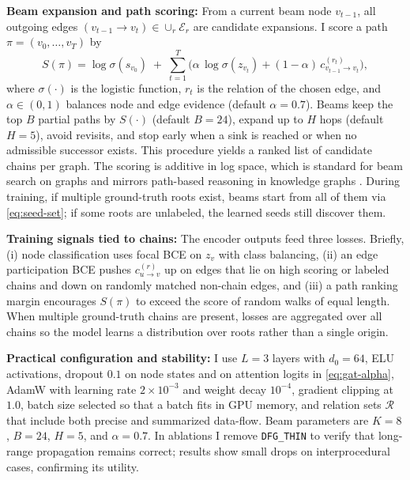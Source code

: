\documentclass{buthesis}
\begin{document}
\textbf{Beam expansion and path scoring:} From a current beam node $v_{t-1}$, all outgoing edges $(v_{t-1}\!\to\!v_t)\in\cup_r \mathcal{E}_r$ are candidate expansions. I score a path $\pi=(v_0,\ldots,v_T)$ by
\begin{equation}
\label{eq:path-score}
S(\pi) = \log \sigma(s_{v_0}) \;+\; \sum_{t=1}^{T}\big(\alpha\,\log \sigma(z_{v_t}) + (1-\alpha)\,c^{(r_t)}_{v_{t-1}\to v_t}\big),
\end{equation}
where $\sigma(\cdot)$ is the logistic function, $r_t$ is the relation of the chosen edge, and $\alpha\in(0,1)$ balances node and edge evidence (default $\alpha{=}0.7$). Beams keep the top $B$ partial paths by $S(\cdot)$ (default $B{=}24$), expand up to $H$ hops (default $H{=}5$), avoid revisits, and stop early when a sink is reached or when no admissible successor exists. This procedure yields a ranked list of candidate chains per graph. The scoring is additive in log space, which is standard for beam search on graphs and mirrors path-based reasoning in knowledge graphs \cite{das2018minerva,xiong2017deeppath}. During training, if multiple ground-truth roots exist, beams start from all of them via \eqref{eq:seed-set}; if some roots are unlabeled, the learned seeds still discover them.

\textbf{Training signals tied to chains:} The encoder outputs feed three losses. Briefly, (i) node classification uses focal BCE on $z_v$ with class balancing, (ii) an edge participation BCE pushes $c^{(r)}_{u\to v}$ up on edges that lie on high scoring or labeled chains and down on randomly matched non-chain edges, and (iii) a path ranking margin encourages $S(\pi)$ to exceed the score of random walks of equal length. When multiple ground-truth chains are present, losses are aggregated over all chains so the model learns a distribution over roots rather than a single origin.

\textbf{Practical configuration and stability:} I use $L{=}3$ layers with $d_0{=}64$, ELU activations, dropout $0.1$ on node states and on attention logits in \eqref{eq:gat-alpha}, AdamW with learning rate $2{\times}10^{-3}$ and weight decay $10^{-4}$, gradient clipping at $1.0$, batch size selected so that a batch fits in GPU memory, and relation sets $\mathcal{R}$ that include both precise and summarized data-flow. Beam parameters are $K{=}8$, $B{=}24$, $H{=}5$, and $\alpha{=}0.7$. In ablations I remove \texttt{DFG\_THIN} to verify that long-range propagation remains correct; results show small drops on interprocedural cases, confirming its utility.
\end{document}
